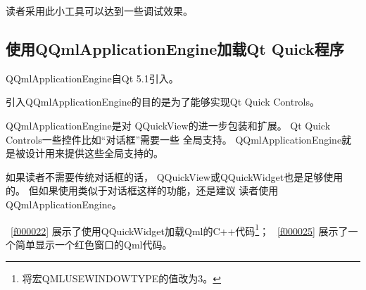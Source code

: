 读者采用此小工具可以达到一些调试效果。

\FloatBarrier
\subsection{
使用QQmlApplicationEngine加载Qt Quick程序
}\label{ss001210}


QQmlApplicationEngine自Qt 5.1引入。

引入QQmlApplicationEngine的目的是为了能够实现Qt Quick Controls。

QQmlApplicationEngine是对
QQuickView的进一步包装和扩展。
Qt Quick Controls一些控件比如“对话框”需要一些
全局支持。
QQmlApplicationEngine就是被设计用来提供这些全局支持的。

如果读者不需要传统对话框的话，
QQuickView或QQuickWidget也是足够使用的。
但如果使用类似于对话框这样的功能，还是建议
读者使用QQmlApplicationEngine。

\lstlistingname\ \ref{f000022}
展示了使用QQuickWidget加载Qml的C{\sourcefonttwo{}+}{\sourcefonttwo{}+}代码\footnote{
将宏QML\underline{\hspace{0.5em}}USE\underline{\hspace{0.5em}}WINDOW\underline{\hspace{0.5em}}TYPE的值改为3。
}；
\lstlistingname\ \ref{f000025}
展示了一个简单显示一个红色窗口的Qml代码。

